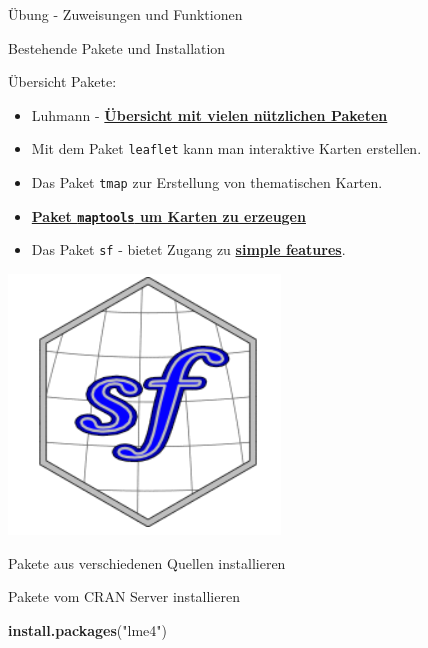 \documentclass[ignorenonframetext,]{beamer}
\newenvironment{Shaded}{\begin{snugshade}}{\end{snugshade}}
\newcommand{\KeywordTok}[1]{\textcolor[rgb]{0.26,0.66,0.93}{\textbf{#1}}}
\newcommand{\NormalTok}[1]{\textcolor[rgb]{0.74,0.68,0.62}{#1}}
\newcommand{\StringTok}[1]{\textcolor[rgb]{0.02,0.61,0.04}{#1}}
\providecommand{\tightlist}{%
  \setlength{\itemsep}{0pt}\setlength{\parskip}{0pt}}
\begin{document}
\begin{frame}[fragile]{Übung - Zuweisungen und Funktionen}
\begin{frame}{Bestehende Pakete und Installation}
\end{frame}

\begin{frame}[fragile]{Übersicht Pakete:}
\protect\hypertarget{ubersicht-pakete}{}

\begin{itemize}
\tightlist
\item
  Luhmann -
  \href{http://www.beltz.de/fileadmin/beltz/downloads/OnlinematerialienPVU/28090_Luhmann/Verwendete\%20Pakete.pdf}{\textbf{Übersicht
  mit vielen nützlichen Paketen}}
\item
  Mit dem Paket \texttt{leaflet} kann man interaktive Karten erstellen.
\item
  Das Paket \texttt{tmap} zur Erstellung von thematischen Karten.
\item
  \href{http://www.r-bloggers.com/tag/maptools/}{\textbf{Paket
  \texttt{maptools} um Karten zu erzeugen}}
\item
  Das Paket \texttt{sf} - bietet Zugang zu
  \href{https://de.wikipedia.org/wiki/Simple_Feature_Access}{\textbf{simple
  features}}.
\end{itemize}

\includegraphics{figure/logo_sf.PNG}

\end{frame}

\begin{frame}[fragile]{Pakete aus verschiedenen Quellen installieren}
\protect\hypertarget{pakete-aus-verschiedenen-quellen-installieren}{}

\begin{block}{Pakete vom CRAN Server installieren}

\begin{Shaded}
\begin{Highlighting}[]
\KeywordTok{install.packages}\NormalTok{(}\StringTok{"lme4"}\NormalTok{)}
\end{Highlighting}
\end{Shaded}


\end{block}
\end{frame}
\end{frame}
\end{document}
